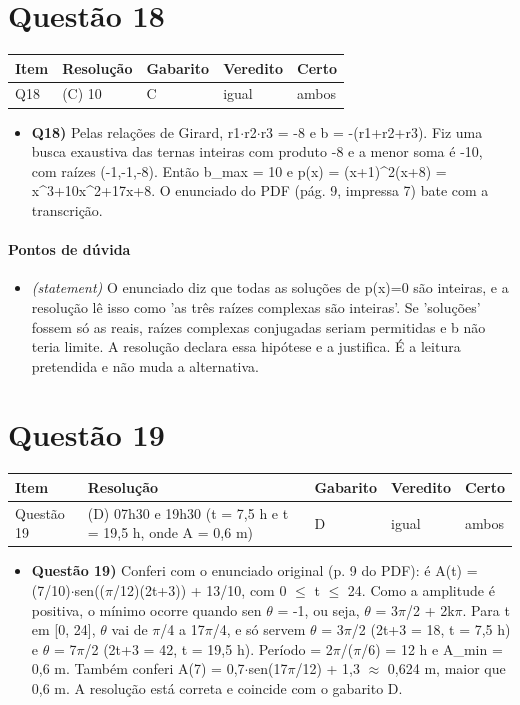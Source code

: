 \documentclass{article}%
\begin{document}
\section*{Questão 18}%
\begin{longtable}{@{}p{} p{} p{} p{} p{}@{}}\toprule Item & Resolução & Gabarito & Veredito & Certo \\ \midrule
Q18 & (C) 10 & C & igual & ambos \\
\bottomrule\end{longtable}%
\begin{itemize}%
\item%
\textbf{Q18)} Pelas relações de Girard, r1$\cdot$r2$\cdot$r3 = {-}8 e b = {-}(r1+r2+r3). Fiz uma busca exaustiva das ternas inteiras com produto {-}8 e a menor soma é {-}10, com raízes ({-}1,{-}1,{-}8). Então b\_max = 10 e p(x) = (x+1)\^{}2(x+8) = x\^{}3+10x\^{}2+17x+8. O enunciado do PDF (pág. 9, impressa 7) bate com a transcrição.%
\end{itemize}%
\paragraph{Pontos de dúvida}%
\begin{itemize}%
\item%
\textit{(statement)} O enunciado diz que todas as soluções de p(x)=0 são inteiras, e a resolução lê isso como 'as três raízes complexas são inteiras'. Se 'soluções' fossem só as reais, raízes complexas conjugadas seriam permitidas e b não teria limite. A resolução declara essa hipótese e a justifica. É a leitura pretendida e não muda a alternativa.%
\end{itemize}%
\section*{Questão 19}%
\begin{longtable}{@{}p{} p{} p{} p{} p{}@{}}\toprule Item & Resolução & Gabarito & Veredito & Certo \\ \midrule
Questão 19 & (D) 07h30 e 19h30 (t = 7,5 h e t = 19,5 h, onde A = 0,6 m) & D & igual & ambos \\
\bottomrule\end{longtable}%
\begin{itemize}%
\item%
\textbf{Questão 19)} Conferi com o enunciado original (p. 9 do PDF): é A(t) = (7/10)$\cdot$sen(($\pi$/12)(2t+3)) + 13/10, com 0 $\leq$ t $\leq$ 24. Como a amplitude é positiva, o mínimo ocorre quando sen $\theta$ = -1, ou seja, $\theta$ = 3$\pi$/2 + 2k$\pi$. Para t em {[}0, 24{]}, $\theta$ vai de $\pi$/4 a 17$\pi$/4, e só servem $\theta$ = 3$\pi$/2 (2t+3 = 18, t = 7,5 h) e $\theta$ = 7$\pi$/2 (2t+3 = 42, t = 19,5 h). Período = 2$\pi$/($\pi$/6) = 12 h e A\_min = 0,6 m. Também conferi A(7) = 0,7$\cdot$sen(17$\pi$/12) + 1,3 $\approx$ 0,624 m, maior que 0,6 m. A resolução está correta e coincide com o gabarito D.%
\end{itemize}%
\end{document}
